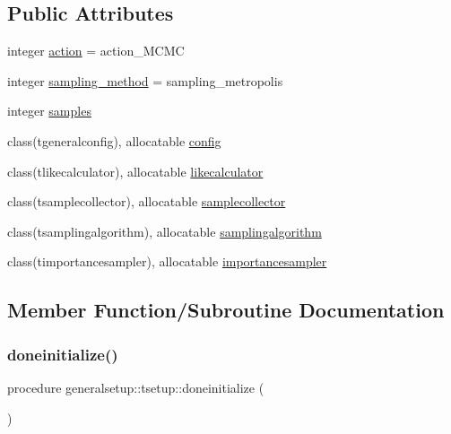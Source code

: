 \subsection*{Public Attributes}
\begin{DoxyCompactItemize}
\item 
integer \mbox{\hyperlink{structgeneralsetup_1_1tsetup_ad3d58a4fce868cd773ea454f5afb35f9}{action}} = action\+\_\+\+M\+C\+MC
\item 
integer \mbox{\hyperlink{structgeneralsetup_1_1tsetup_a725c9db92f823aa7352f2cc7a214e731}{sampling\+\_\+method}} = sampling\+\_\+metropolis
\item 
integer \mbox{\hyperlink{structgeneralsetup_1_1tsetup_a6364311b2a6a5654e3d0746ff9de1596}{samples}}
\item 
class(tgeneralconfig), allocatable \mbox{\hyperlink{structgeneralsetup_1_1tsetup_a9597fbc6c2c1fcec8abfa82f7a3300ff}{config}}
\item 
class(tlikecalculator), allocatable \mbox{\hyperlink{structgeneralsetup_1_1tsetup_a1d284ac97bdecfedabea0fd1e9dd96a3}{likecalculator}}
\item 
class(tsamplecollector), allocatable \mbox{\hyperlink{structgeneralsetup_1_1tsetup_a1e63c0aaf6f63e2574d0f363295cf185}{samplecollector}}
\item 
class(tsamplingalgorithm), allocatable \mbox{\hyperlink{structgeneralsetup_1_1tsetup_a646d2a8444a296a5cc35c1bce832b3ba}{samplingalgorithm}}
\item 
class(timportancesampler), allocatable \mbox{\hyperlink{structgeneralsetup_1_1tsetup_acb83c5be990d6f2c5154dbbd1f87d50c}{importancesampler}}
\end{DoxyCompactItemize}


\subsection{Member Function/\+Subroutine Documentation}
\mbox{\label{structgeneralsetup_1_1tsetup_a8763a98a993f13722d651acd8bfb1c3c}} 
\subsubsection{\texorpdfstring{doneinitialize()}{doneinitialize()}}
{\footnotesize\ttfamily procedure generalsetup\+::tsetup\+::doneinitialize (\begin{DoxyParamCaption}{ }\end{DoxyParamCaption})}

